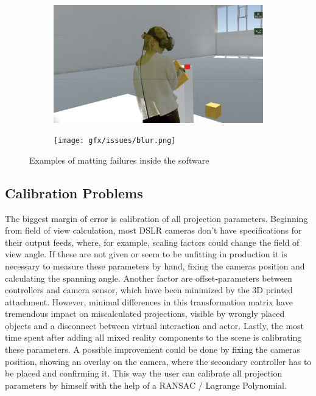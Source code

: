 \begin{figure}
	\begin{subfigure}[t]{.45\textwidth}
		\centering
		\includegraphics[width=\textwidth]{gfx/issues/spill.png}
	\end{subfigure}
	\begin{subfigure}[t]{.45\textwidth}
		\centering
		\texttt{[image: gfx/issues/blur.png]}
	\end{subfigure}
	\caption{Examples of matting failures inside the software}
	\label{fig:issue:blur}
\end{figure}

\subsection{Calibration Problems}

The biggest margin of error is calibration of all projection parameters.
\newline
Beginning from field of view calculation, most DSLR cameras don't have 
specifications for their output feeds, where, for example, scaling factors 
could change the field of view angle. If these are not given or seem to be 
unfitting in production it is necessary to measure these parameters by hand, 
fixing the cameras position and calculating the spanning angle.
Another factor are offset-parameters between controllers and camera sensor, 
which have been minimized by the 3D printed attachment. However, minimal 
differences in this transformation matrix have tremendous impact on 
miscalculated projections, visible by wrongly placed objects and a disconnect 
between virtual interaction and actor.
Lastly, the most time spent after adding all mixed reality components to the 
scene is calibrating these parameters. A possible improvement could be done by 
fixing the cameras position, showing an overlay on the camera, where the 
secondary controller has to be placed and confirming it. This way the user can 
calibrate all projection parameters by himself with the help of a RANSAC / 
Lagrange Polynomial.

